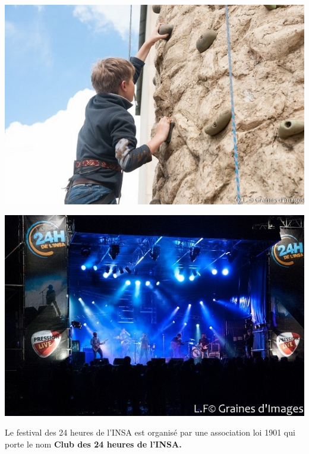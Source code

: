 \documentclass[hidelinks, paper=a4, fontsize=13pt]{report}
\begin{document}
\begin{minipage}[c]{.48\linewidth}
		\begin{center}
      \includegraphics[scale =1]{Annexes/Images/prez3}
		\end{center}
\end{minipage} \hfill
\begin{minipage}[c]{.48\linewidth}
		\begin{center}
      \includegraphics[scale =1]{Annexes/Images/prez4}
		\end{center}
\end{minipage}
\newpage
Le festival des 24 heures de l’INSA est organisé par une association loi 1901 qui porte le nom \textbf{Club des 24 heures de l’INSA.}
\end{document}
